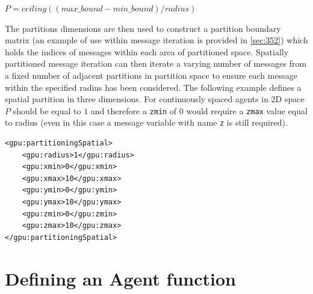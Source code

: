 \documentclass[11pt, a4paper, onecolumn, oneside]{report}
\begin{document}
$P = ceiling((max\_bound - min\_bound) / radius)$

The partitions dimensions are then used to construct a partition boundary matrix (an example of use within message iteration is provided in \cref{sec:352}) which holds the indices of messages within each area of partitioned space.
Spatially partitioned message iteration can then iterate a varying number of messages from a fixed number of adjacent partitions in partition space to ensure each message within the specified radius has been considered.
The following example defines a spatial partition in three dimensions.
For continuously spaced agents in 2D space $P$ should be equal to $1$ and therefore a \texttt{zmin} of $0$ would require a \texttt{zmax} value equal to radius (even in this case a message variable with name \texttt{z} is still required).

\begin{verbatim}
<gpu:partitioningSpatial>
    <gpu:radius>1</gpu:radius>
    <gpu:xmin>0</gpu:xmin>
    <gpu:xmax>10</gpu:xmax>
    <gpu:ymin>0</gpu:ymin>
    <gpu:ymax>10</gpu:ymax>
    <gpu:zmin>0</gpu:zmin>
    <gpu:zmax>10</gpu:zmax>
</gpu:partitioningSpatial>
\end{verbatim}



\section{Defining an Agent function}
\label{sec:25}
\end{document}
